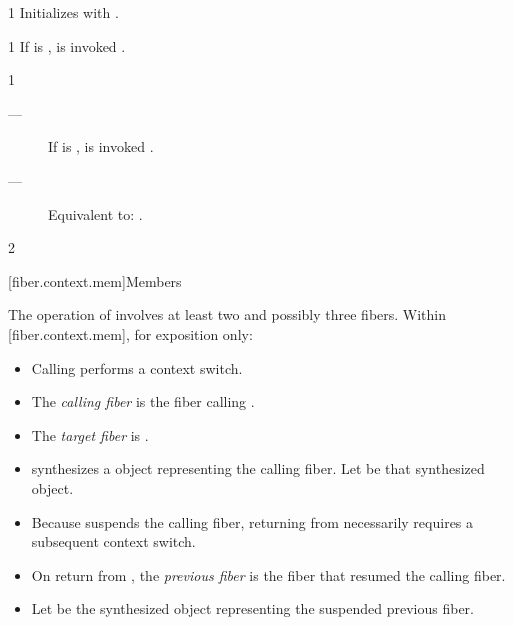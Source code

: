1 \effects
Initializes  with .


1 \effects
If \emptyfn is \false,  is invoked .


1 \effects
\begin{description}
    \item[---] If \emptyfn is \false,  is invoked .
    \item[---] Equivalent to: .
\end{description}

2 \returns
\this

[fiber.context.mem]{Members}

The operation of \resumewith involves at least two and possibly three fibers.
Within [fiber.context.mem], for exposition only:

\begin{itemize}
    \item Calling \resumewith performs a context switch.
    \item The \emph{calling fiber} is the fiber calling \resumewith.
    \item The \emph{target fiber} is \thefiber{\state}.
    \item \resumewith synthesizes a \fiber object representing the calling
          fiber. Let  be that synthesized \fiber object.
    \item Because \resumewith suspends the calling fiber, returning
          from \resumewith necessarily requires a subsequent context switch.
    \item On return from \resumewith, the \emph{previous fiber} is the fiber that
          resumed the calling fiber.
    \item Let  be the synthesized \fiber object representing the
          suspended previous fiber.
\end{itemize}

